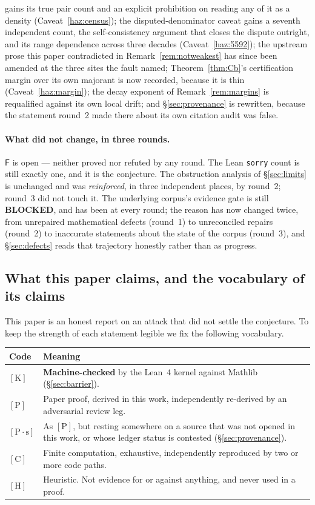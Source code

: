 \documentclass[11pt,a4paper]{article}
\theoremstyle{plain}
\theoremstyle{definition}
\theoremstyle{remark}
\newcommand{\cK}{{[\mathrm{K}]}}
\newcommand{\cP}{{[\mathrm{P}]}}
\newcommand{\cPs}{{[\mathrm{P}\!\cdot\!\mathrm{s}]}}
\newcommand{\cC}{{[\mathrm{C}]}}
\newcommand{\cH}{{[\mathrm{H}]}}
\newcommand{\Fb}{\mathsf{F}}
\begin{document}
gains its true pair count and an explicit prohibition on reading any of it as a density
(Caveat~\ref{haz:census}); the disputed-denominator caveat gains a seventh independent count,
the self-consistency argument that closes the dispute outright, and its range dependence
across three decades (Caveat~\ref{haz:5592}); the upstream prose this paper contradicted in
Remark~\ref{rem:notweakest} has since been amended at the three sites the fault named;
Theorem~\ref{thm:Cb}'s certification margin over its own majorant is now recorded, because it
is thin (Caveat~\ref{haz:margin}); the decay exponent of Remark~\ref{rem:margins} is
requalified against its own local drift; and \S\ref{sec:provenance} is rewritten, because the
statement round~2 made there about its own citation audit was false.

\paragraph{What did not change, in three rounds.} $\Fb$ is open --- neither proved nor refuted
by any round. The Lean \texttt{sorry} count is still exactly one, and it is the conjecture.
The obstruction analysis of \S\ref{sec:limits} is unchanged and was \emph{reinforced}, in
three independent places, by round~2; round~3 did not touch it. The underlying corpus's
evidence gate is still \textbf{BLOCKED}, and has been at every round; the reason has now
changed twice, from unrepaired mathematical defects (round~1) to unreconciled repairs
(round~2) to inaccurate statements about the state of the corpus (round~3), and
\S\ref{sec:defects} reads that trajectory honestly rather than as progress.

\subsection{What this paper claims, and the vocabulary of its claims}
\label{sec:vocab}

This paper is an honest report on an attack that did not settle the conjecture. To keep the
strength of each statement legible we fix the following vocabulary.

\begin{center}
\begin{tabular}{@{}l p{}@{}}
\toprule
Code & Meaning \\
\midrule
$\cK$ & \textbf{Machine-checked} by the Lean~4 kernel against Mathlib (\S\ref{sec:barrier}). \\
$\cP$ & Paper proof, derived in this work, independently re-derived by an adversarial review leg. \\
$\cPs$ & As $\cP$, but resting somewhere on a source that was not opened in this work, or whose
  ledger status is contested (\S\ref{sec:provenance}). \\
$\cC$ & Finite computation, exhaustive, independently reproduced by two or more code paths. \\
$\cH$ & Heuristic. Not evidence for or against anything, and never used in a proof. \\
\bottomrule
\end{tabular}
\end{center}
\end{document}
